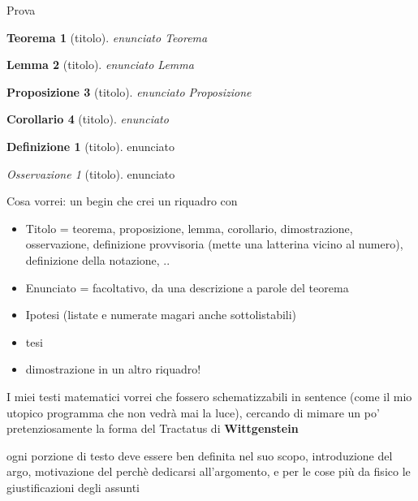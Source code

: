\documentclass[a4paper,12pt]{report}	%
\theoremstyle{plain}
\newtheorem{thm}{Teorema}[section]
\newtheorem{cor}[thm]{Corollario}
\newtheorem{lem}[thm]{Lemma}
\newtheorem{prop}[thm]{Proposizione}
\theoremstyle{definition}
\newtheorem{defn}{Definizione}[chapter]
\theoremstyle{remark}
\newtheorem{oss}{Osservazione}
\begin{document}
Prova

\begin{thm}[titolo]
enunciato Teorema
\end{thm}

\begin{lem}[titolo]
enunciato Lemma
\end{lem}

\begin{prop}[titolo]
enunciato Proposizione
\end{prop}

\begin{cor}[titolo]
enunciato
\end{cor}

\begin{defn}[titolo]
enunciato
\end{defn}

\begin{oss}[titolo]
enunciato
\end{oss}

Cosa vorrei:
un begin che crei un riquadro con
\begin{itemize}
\item Titolo = teorema, proposizione, lemma, corollario, dimostrazione, osservazione, definizione provvisoria (mette una latterina vicino al numero), definizione della notazione, ..
\item Enunciato = facoltativo, da una descrizione a parole del teorema
\item Ipotesi (listate e numerate magari anche sottolistabili)
\item tesi
\item dimostrazione in un altro riquadro!

\end{itemize}

I miei testi matematici vorrei che fossero schematizzabili in sentence (come il mio utopico programma che non vedrà mai la luce), cercando di mimare un po' pretenziosamente la forma del Tractatus di \textbf{Wittgenstein}

ogni porzione di testo deve essere ben definita nel suo scopo, introduzione del argo, motivazione del perchè dedicarsi all'argomento, e per le cose più da fisico le giustificazioni degli assunti
\end{document}
